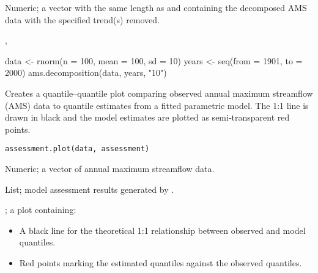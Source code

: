 \documentclass[a4paper]{book}
\begin{document}
%
\begin{Value}
Numeric; a vector with the same length as  and  containing
the decomposed AMS data with the specified trend(s) removed.
\end{Value}
%
\begin{SeeAlso}
, 
\end{SeeAlso}
%
\begin{Examples}
\begin{ExampleCode}
data <- rnorm(n = 100, mean = 100, sd = 10)
years <- seq(from = 1901, to = 2000)
ams.decomposition(data, years, "10")

\end{ExampleCode}
\end{Examples}
%
\begin{Description}
Creates a quantile–quantile plot comparing observed annual maximum streamflow (AMS)
data to quantile estimates from a fitted parametric model. The 1:1 line is drawn in
black and the model estimates are plotted as semi‐transparent red points.
\end{Description}
%
\begin{Usage}
\begin{verbatim}
assessment.plot(data, assessment)
\end{verbatim}
\end{Usage}
%
\begin{Arguments}
\begin{ldescription}
\item[\code{data}] Numeric; a vector of annual maximum streamflow data.

\item[\code{assessment}] List; model assessment results generated by .
\end{ldescription}
\end{Arguments}
%
\begin{Value}
; a plot containing:
\begin{itemize}

\item{} A black line for the theoretical 1:1 relationship between observed and model quantiles.
\item{} Red points marking the estimated quantiles against the observed quantiles.

\end{itemize}

\end{Value}
\end{document}
